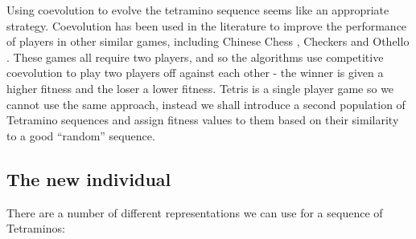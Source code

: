 \documentclass[a4paper,11pt]{article}
\begin{document}
Using coevolution to evolve the tetramino sequence seems like an appropriate
strategy.
Coevolution has been used in the literature to improve the performance of
players in other similar games, including Chinese Chess
\cite{ong2007discovering}, Checkers \cite{chellapilla1999evolving} and
Othello \cite{moriarty1995discovering}.
These games all require two players, and so the algorithms use competitive
coevolution to play two players off against each other - the winner is given a
higher fitness and the loser a lower fitness.
Tetris is a single player game so we cannot use the same approach, instead we
shall introduce a second population of Tetramino sequences and assign fitness
values to them based on their similarity to a good ``random'' sequence.

\subsection{The new individual}

There are a number of different representations we can use for a sequence of
Tetraminos:
\end{document}
